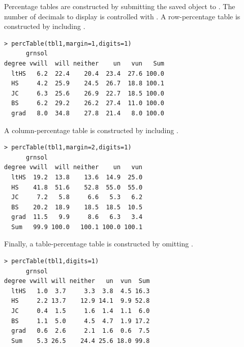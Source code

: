 \documentclass[10pt,openany]{book}\usepackage[]{graphicx}\usepackage[]{color}
\makeatletter
\newenvironment{kframe}{%
 \def\at@end@of@kframe{}%
 \ifinner\ifhmode%
  \def\at@end@of@kframe{\end{minipage}}%
  \begin{minipage}{\columnwidth}%
 \fi\fi%
 \def\FrameCommand##1{\hskip\@totalleftmargin \hskip-\fboxsep
 \colorbox{shadecolor}{##1}\hskip-\fboxsep
     \hskip-\linewidth \hskip-\@totalleftmargin \hskip\columnwidth}%
 \MakeFramed {\advance\hsize-\width
   \@totalleftmargin\z@ \linewidth\hsize
   \@setminipage}}%
 {\par\unskip\endMakeFramed%
 \at@end@of@kframe}
\newenvironment{knitrout}{}{} %
\makeatother
\begin{document}
Percentage tables are constructed by submitting the saved  object to . The number of decimals to display is controlled with . A row-percentage table is constructed by including .
\begin{knitrout}
\color{fgcolor}\begin{kframe}
\begin{verbatim}
> percTable(tbl1,margin=1,digits=1)
      grnsol
degree vwill  will neither    un   vun   Sum
  ltHS   6.2  22.4    20.4  23.4  27.6 100.0
  HS     4.2  25.9    24.5  26.7  18.8 100.1
  JC     6.3  25.6    26.9  22.7  18.5 100.0
  BS     6.2  29.2    26.2  27.4  11.0 100.0
  grad   8.0  34.8    27.8  21.4   8.0 100.0
\end{verbatim}
\end{kframe}
\end{knitrout}

A column-percentage table is constructed by including .
\begin{knitrout}
\color{fgcolor}\begin{kframe}
\begin{verbatim}
> percTable(tbl1,margin=2,digits=1)
      grnsol
degree vwill  will neither    un   vun
  ltHS  19.2  13.8    13.6  14.9  25.0
  HS    41.8  51.6    52.8  55.0  55.0
  JC     7.2   5.8     6.6   5.3   6.2
  BS    20.2  18.9    18.5  18.5  10.5
  grad  11.5   9.9     8.6   6.3   3.4
  Sum   99.9 100.0   100.1 100.0 100.1
\end{verbatim}
\end{kframe}
\end{knitrout}

Finally, a table-percentage table is constructed by omitting .
\begin{knitrout}
\color{fgcolor}\begin{kframe}
\begin{verbatim}
> percTable(tbl1,digits=1)
      grnsol
degree vwill will neither   un  vun  Sum
  ltHS   1.0  3.7     3.3  3.8  4.5 16.3
  HS     2.2 13.7    12.9 14.1  9.9 52.8
  JC     0.4  1.5     1.6  1.4  1.1  6.0
  BS     1.1  5.0     4.5  4.7  1.9 17.2
  grad   0.6  2.6     2.1  1.6  0.6  7.5
  Sum    5.3 26.5    24.4 25.6 18.0 99.8
\end{verbatim}
\end{kframe}
\end{knitrout}
\end{document}
